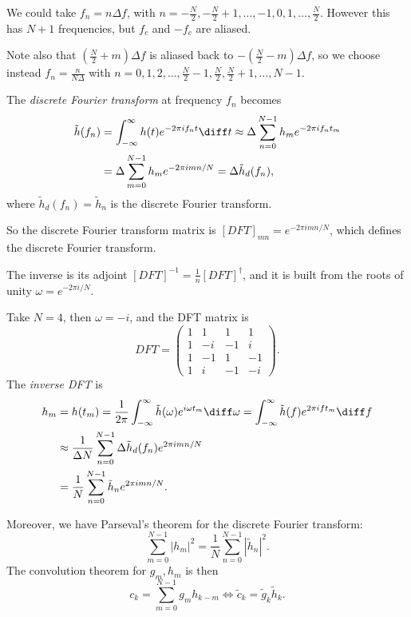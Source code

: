 \documentclass[12pt]{article}
\begin{document}
We could take $f_n = n \Delta f$, with $n = - \frac{N}{2}, -\frac{N}{2} + 1, \ldots, -1, 0, 1, \ldots, \frac{N}{2}$. However this has $N+1$ frequencies, but $f_c$ and $-f_c$ are aliased.

Note also that $(\frac{N}{2} + m)\Delta f$ is aliased back to $-(\frac{N}{2} - m)\Delta f$, so we choose instead $f_n = \frac{n}{N \Delta}$ with $n = 0, 1, 2, \ldots, \frac{N}{2}-1, \frac{N}{2}, \frac{N}{2} + 1, \ldots, N-1$.

The \textit{discrete Fourier transform} at frequency $f_n$ becomes
\begin{align*}
	\tilde h (f_n) &= \int_{-\infty}^{\infty} h(t) e^{-2\pi i f_n t}\diff t \approx \Delta \sum_{n = 0}^{N-1} h_m e^{-2 \pi i f_n t_m} \\
		       &= \Delta \sum_{m = 0}^{N-1}h_m e^{-2 \pi i mn/N} = \Delta \tilde h_d (f_n),
\end{align*}
where $\tilde h_d (f_n) = \tilde h_n$ is the discrete Fourier transform.

So the discrete Fourier transform matrix is $[DFT]_{mn} = e^{-2 \pi i mn/N}$, which defines the discrete Fourier transform.

The inverse is its adjoint $[DFT]^{-1} = \frac{1}{n} [DFT]^{\dagger}$, and it is built from the roots of unity $\omega = e^{-2 \pi i/N}$.

\begin{exbox}
	Take $N = 4$, then $\omega = -i$, and the DFT matrix is
	\[
	DFT = 
	\begin{pmatrix}
		1 & 1 & 1 & 1 \\
		1 & -i & -1 & i \\
		1 & -1 & 1 & -1 \\
		1 & i & -1 & -i
	\end{pmatrix}
	.\]
	The \textit{inverse DFT} is
	\begin{align*}
		h_m &= h(t_m) = \frac{1}{2\pi} \int_{-\infty}^{\infty} \tilde h(\omega) e^{i \omega t_m} \diff \omega = \int_{-\infty}^{\infty}\tilde h(f) e^{2 \pi i f t_m} \diff f \\
		    &\approx \frac{1}{\Delta N} \sum_{n = 0}^{N-1} \Delta \tilde h_d (f_n) e^{2 \pi i mn/N} \\
		    &= \frac{1}{N} \sum_{n = 0}^{N-1} \tilde h_n e^{2 \pi i mn/N}.
	\end{align*}
\end{exbox}

Moreover, we have Parseval's theorem for the discrete Fourier transform:
\[
\sum_{m = 0}^{N-1}|h_m|^2 = \frac{1}{N} \sum_{n = 0}^{N-1}|\tilde h_n|^2
.\]
The convolution theorem for $g_m, h_m$ is then
\[
c_k = \sum_{m = 0}^{N-1}g_m h_{k-m} \iff \tilde c_k = \tilde g_k \tilde h_k
.\]
\end{document}
